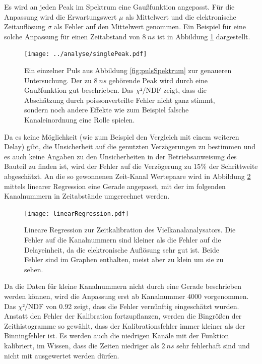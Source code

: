 \documentclass[a4paper,12pt]{article}
\begin{document}
Es wird an jeden Peak  im Spektrum eine Gaußfunktion angepasst.
Für die Anpassung wird die Erwartungswert $μ$ als Mittelwert und die elektronische Zeitauflösung $σ$
als Fehler auf den Mittelwert genommen.
Ein Beispiel für eine solche Anpassung für einen Zeitabstand von $\SI{8}{ns}$ ist in Abbildung \ref{fig:singlePuls} dargestellt.

\begin{figure}[h]
	\texttt{[image: ../analyse/singlePeak.pdf]}
	\caption{Ein einzelner Puls aus Abbildung \ref{fig:pulsSpektrum} zur genaueren Untersuchung. Der zu
	$\SI{8}{ns}$ gehörende Peak wird durch eine Gaußfunktion gut beschrieben. Das $χ²/\text{NDF}$
	zeigt, dass die Abschätzung durch poissonverteilte Fehler nicht ganz stimmt, sondern noch andere
	Effekte wie zum Beispiel falsche Kanaleinordnung eine Rolle spielen.}
	\label{fig:singlePuls}
\end{figure}

Da es keine Möglichkeit (wie zum Beispiel den Vergleich mit einem weiteren Delay) gibt, die Unsicherheit auf die genutzten Verzögerungen zu bestimmen und es auch keine Angaben zu
 den Unsicherheiten in der Betriebsanweisung des Bauteil zu finden ist, wird der Fehler auf die
 Verzögerung zu 15\% der Schrittweite abgeschätzt.
 An die so gewonnenen Zeit-Kanal Wertepaare wird in Abbildung \ref{fig:kalibrationsRegression} mittels linearer Regression eine Gerade angepasst, mit der im folgenden
Kanalnummern in Zeitabstände umgerechnet werden.

\begin{figure}
	\texttt{[image: linearRegression.pdf]}
	\caption{Lineare Regression zur Zeitkalibration des Vielkanalanalysators. Die Fehler auf die
	Kanalnummern sind kleiner als die Fehler auf die Delayeinheit, da die elektronische Auflösung sehr gut ist.
	Beide Fehler sind im Graphen enthalten, meist aber zu klein um sie zu sehen.}
	\label{fig:kalibrationsRegression}
\end{figure}

Da die Daten für kleine Kanalnummern nicht durch eine Gerade beschrieben werden können, wird die
Anpassung erst ab Kanalnummer $4000$ vorgenommen.
Das $χ²/\text{NDF}$ von 0.92  zeigt, dass die Fehler vernünftig eingeschätzt wurden.
Anstatt den Fehler der Kalibration fortzupflanzen, werden die Bingrößen der Zeithistogramme so
gewählt, dass der Kalibrationsfehler immer kleiner als der Binningfehler ist.
Es werden auch die niedrigen Kanäle mit der Funktion kalibriert, im Wissen, dass die Zeiten niedriger
als $\SI{2}{ns}$ sehr fehlerhaft sind und nicht mit ausgewertet werden dürfen.
\end{document}
